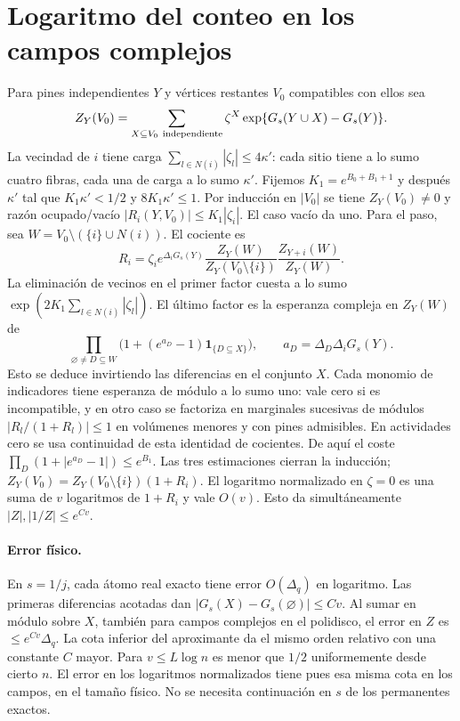 \section{Logaritmo del conteo en los campos complejos}
Para pines independientes $Y$ y vértices restantes $V_0$ compatibles con ellos sea
\[
 Z_Y(V_0)=\sum_{X\subseteq V_0\ {\rm independiente}}\zeta^X
                  \exp\{G_s(Y\cup X)-G_s(Y)\}.
\]
La vecindad de $i$ tiene carga $\sum_{l\in N(i)}|\zeta_l|\le4\kappa'$:
cada sitio tiene a lo sumo cuatro fibras, cada una de carga a lo sumo $\kappa'$.
Fijemos $K_1=e^{B_0+B_1+1}$ y después $\kappa'$ tal que
$K_1\kappa'<1/2$ y $8K_1\kappa'\le1$.
Por inducción en $|V_0|$ se tiene $Z_Y(V_0)\ne0$ y razón ocupado/vacío
$|R_i(Y,V_0)|\le K_1|\zeta_i|$. El caso vacío da uno.
Para el paso, sea $W=V_0\setminus(\{i\}\cup N(i))$. El cociente es
\[
 R_i=\zeta_i e^{\Delta_iG_s(Y)}
        \frac{Z_Y(W)}{Z_Y(V_0\setminus\{i\})}
        \frac{Z_{Y+i}(W)}{Z_Y(W)} .
\]
La eliminación de vecinos en el primer factor cuesta a lo sumo
$\exp(2K_1\sum_{l\in N(i)}|\zeta_l|)$. El último factor es la esperanza compleja
en $Z_Y(W)$ de
\[
 \prod_{\varnothing\ne D\subseteq W}
       \bigl(1+(e^{a_D}-1)\mathbf1_{\{D\subseteq X\}}\bigr),\qquad
 a_D=\Delta_D\Delta_iG_s(Y).
\]
Esto se deduce invirtiendo las diferencias en el conjunto $X$. Cada monomio de
indicadores tiene esperanza de módulo a lo sumo uno: vale cero si es incompatible,
y en otro caso se factoriza en marginales sucesivas de módulos
$|R_l/(1+R_l)|\le1$ en volúmenes menores y con pines admisibles. En actividades
cero se usa continuidad de esta identidad de cocientes. De aquí el coste
$\prod_D(1+|e^{a_D}-1|)\le e^{B_1}$. Las tres estimaciones cierran la inducción;
$Z_Y(V_0)=Z_Y(V_0\setminus\{i\})(1+R_i)$.
El logaritmo normalizado en $\zeta=0$ es una suma de $v$ logaritmos de $1+R_i$
y vale $O(v)$. Esto da simultáneamente $|Z|,|1/Z|\le e^{Cv}$.
\paragraph{Error físico.}
En $s=1/j$, cada átomo real exacto tiene error $O(\Delta_q)$ en logaritmo.
Las primeras diferencias acotadas dan $|G_s(X)-G_s(\varnothing)|\le Cv$.
Al sumar en módulo sobre $X$, también para campos complejos en el polidisco,
el error en $Z$ es $\le e^{Cv}\Delta_q$. La cota inferior del aproximante
da el mismo orden relativo con una constante $C$ mayor. Para $v\le L\log n$
es menor que $1/2$ uniformemente desde cierto $n$. El error en los logaritmos
normalizados tiene pues esa misma cota en los campos, en el tamaño físico.
No se necesita continuación en $s$ de los permanentes exactos.
